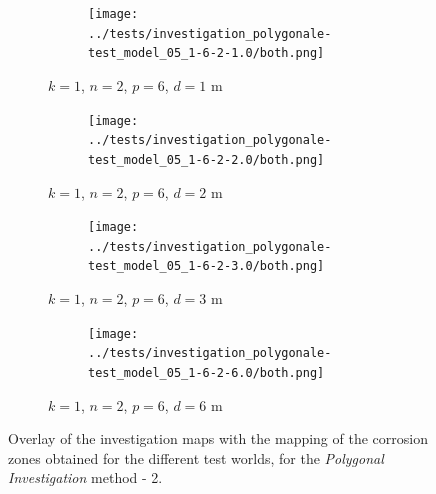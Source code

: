 \begin{theappendices}
		\begin{figure}[H]
			\centering
			\begin{subfigure}[t]{\linewidth}
				\centering
				\begin{subfigure}[t]{0.2\linewidth}
					\texttt{[image: ../tests/investigation\_polygonale-test\_model\_05\_1-6-2-1.0/both.png]}
				\end{subfigure}
				\caption{$k = 1$, $n = 2$, $p = 6$, $d = 1$ m}
			\end{subfigure}
			\hfill
			\begin{subfigure}[t]{\linewidth}
				\centering
				\begin{subfigure}[t]{0.2\linewidth}
					\texttt{[image: ../tests/investigation\_polygonale-test\_model\_05\_1-6-2-2.0/both.png]}
				\end{subfigure}
				\caption{$k = 1$, $n = 2$, $p = 6$, $d = 2$ m}
			\end{subfigure}
			\hfill
			\begin{subfigure}[t]{\linewidth}
				\centering
				\begin{subfigure}[t]{0.2\linewidth}
					\texttt{[image: ../tests/investigation\_polygonale-test\_model\_05\_1-6-2-3.0/both.png]}
				\end{subfigure}
				\caption{$k = 1$, $n = 2$, $p = 6$, $d = 3$ m}
			\end{subfigure}
			\hfill
			\begin{subfigure}[t]{\linewidth}
				\centering
				\begin{subfigure}[t]{0.2\linewidth}
					\texttt{[image: ../tests/investigation\_polygonale-test\_model\_05\_1-6-2-6.0/both.png]}
				\end{subfigure}
				\caption{$k = 1$, $n = 2$, $p = 6$, $d = 6$ m}
			\end{subfigure}
			\caption{Overlay of the investigation maps with the mapping of the corrosion zones obtained for the different test worlds, for the \textit{Polygonal Investigation} method - 2.}
			\label{fig:investigation_polygonale_resultats_2}
		\end{figure}

\end{theappendices}

